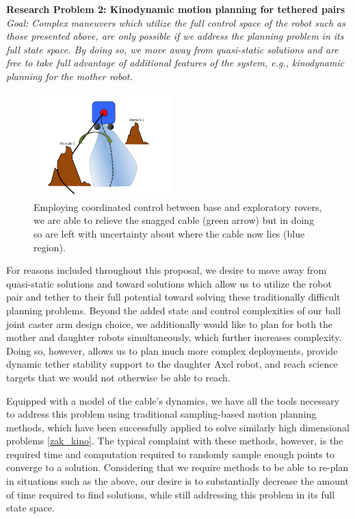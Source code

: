 \documentclass[12pt]{article}
\begin{document}
{\bf Research Problem 2: Kinodynamic motion planning for tethered pairs \\}
{\sl Goal: Complex maneuvers which utilize the full control space of the robot such as those presented above, 
are only possible if we address the planning problem in its full state space. By doing so, we move away from quasi-static 
solutions and are free to take full advantage of additional features of the system, e.g., kinodynamic planning for the mother
robot. }
\begin{figure}
  \begin{center}
	\vspace{-0.5in}	
	\includegraphics[width=0.48\textwidth, left]{cable_uncertainty}
  \end{center}
  \vspace{-0.5in}
  \label{fig:cable}
  \caption{Employing coordinated control between base and exploratory rovers, we are able to relieve the snagged cable (green arrow) but in doing so are left with uncertainty about where the cable now lies (blue region).}
\end{figure}
\vspace{-0.15in}

For reasons included throughout this proposal, we desire to move away from quasi-static solutions and 
toward solutions which allow us to utilize the robot pair and tether to their full potential toward solving 
these traditionally difficult planning problems. Beyond the added state and control complexities of our 
ball joint caster arm design choice, we additionally would like to plan for both the mother and daughter 
robots simultaneously, which further increases complexity. Doing so, however, allows us to plan much more complex deployments, 
provide dynamic tether stability support to the daughter Axel robot, and reach science targets that we would not otherwise 
be able to reach.

Equipped with a model of the cable's dynamics, we have all the tools necessary to address this problem 
using traditional sampling-based motion planning methods, which have been successfully applied to solve similarly 
high dimensional problems \ref{zak_kino}. The typical complaint with these methods, however, is the required time and 
computation required to randomly sample enough points to converge to a solution. Considering that we require 
methods to be able to re-plan in situations such as the above, our desire is to substantially decrease the amount of time 
required to find solutions, while still addressing this problem in its full state space. 
\end{document}
